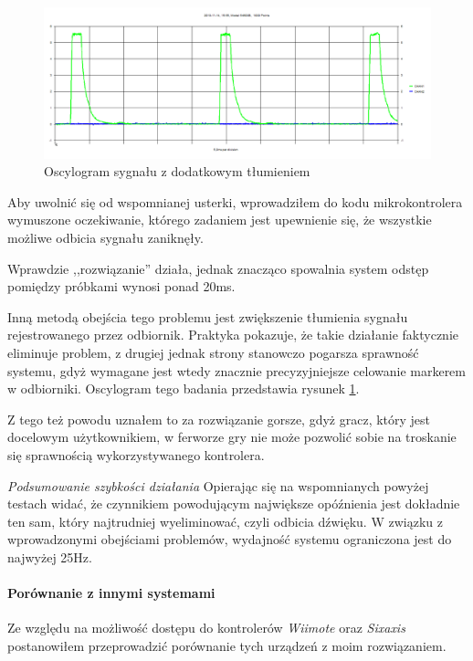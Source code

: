 \begin{figure}
 \includegraphics[width=\textwidth]{gfx/oscyloskop_attenuated.png}
 \caption{Oscylogram sygnału z dodatkowym tłumieniem}
 \label{fig:oscilloscope_attenuated}
\end{figure}


Aby uwolnić się od wspomnianej usterki, wprowadziłem do kodu mikrokontrolera wymuszone oczekiwanie, którego zadaniem jest upewnienie się, że wszystkie możliwe odbicia sygnału zaniknęły.

Wprawdzie ,,rozwiązanie'' działa, jednak znacząco spowalnia system \ppauza odstęp pomiędzy próbkami wynosi ponad 20ms.

Inną metodą obejścia tego problemu jest zwiększenie tłumienia sygnału rejestrowanego przez odbiornik. Praktyka pokazuje, że takie działanie faktycznie eliminuje problem, z drugiej jednak strony stanowczo pogarsza sprawność systemu, gdyż wymagane jest wtedy znacznie precyzyjniejsze celowanie markerem w odbiorniki. Oscylogram tego badania przedstawia rysunek \ref{fig:oscilloscope_attenuated}.

Z tego też powodu uznałem to za rozwiązanie gorsze, gdyż gracz, który jest docelowym użytkownikiem, w ferworze gry nie może pozwolić sobie na troskanie się sprawnością wykorzystywanego kontrolera.

\textsl{Podsumowanie szybkości działania}
Opierając się na wspomnianych powyżej testach widać, że czynnikiem powodującym największe opóźnienia jest dokładnie ten sam, który najtrudniej wyeliminować, czyli odbicia dźwięku. W związku z wprowadzonymi obejściami problemów, wydajność systemu ograniczona jest do najwyżej 25Hz.

\paragraph{Porównanie z innymi systemami}
Ze względu na możliwość dostępu do kontrolerów \textsl{Wiimote} oraz \textsl{Sixaxis} postanowiłem przeprowadzić porównanie tych urządzeń z moim rozwiązaniem.
\newline

